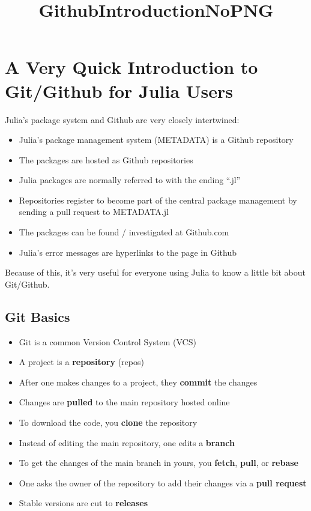 \documentclass[11pt]{article}
\title{GithubIntroductionNoPNG}
\providecommand{\tightlist}{%
      \setlength{\itemsep}{0pt}\setlength{\parskip}{0pt}}
\begin{document}
    
    
    \maketitle
    
    

    
    \section{A Very Quick Introduction to Git/Github for Julia
Users}\label{a-very-quick-introduction-to-gitgithub-for-julia-users}

Julia's package system and Github are very closely intertwined:

\begin{itemize}
\tightlist
\item
  Julia's package management system (METADATA) is a Github repository
\item
  The packages are hosted as Github repositories
\item
  Julia packages are normally referred to with the ending ``.jl''
\item
  Repositories register to become part of the central package management
  by sending a pull request to METADATA.jl
\item
  The packages can be found / investigated at Github.com
\item
  Julia's error messages are hyperlinks to the page in Github
\end{itemize}

Because of this, it's very useful for everyone using Julia to know a
little bit about Git/Github.

    \subsection{Git Basics}\label{git-basics}

\begin{itemize}
\tightlist
\item
  Git is a common Version Control System (VCS)
\item
  A project is a \textbf{repository} (repos)
\item
  After one makes changes to a project, they \textbf{commit} the changes
\item
  Changes are \textbf{pulled} to the main repository hosted online
\item
  To download the code, you \textbf{clone} the repository
\item
  Instead of editing the main repository, one edits a \textbf{branch}
\item
  To get the changes of the main branch in yours, you \textbf{fetch},
  \textbf{pull}, or \textbf{rebase}
\item
  One asks the owner of the repository to add their changes via a
  \textbf{pull request}
\item
  Stable versions are cut to \textbf{releases}
\end{itemize}
\end{document}
